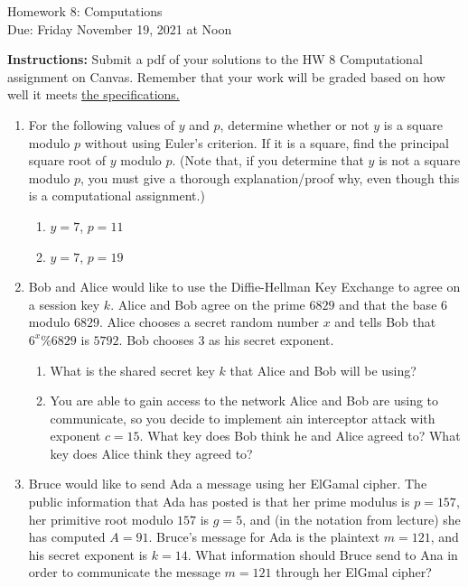 \documentclass[10pt,a4paper]{article}
\begin{document}
\begin{center}
{\Large Homework 8: Computations}\\
Due: Friday November 19, 2021 at Noon\\


\end{center}
{\bf Instructions:} Submit a pdf of your solutions to the HW 8 Computational assignment on Canvas. Remember that your work will be graded based on how well it meets \href{https://docs.google.com/document/d/1emM06_WRh_h941rsjtRE9fRVndJtfRKd9gyS3Fs_rFA/edit?usp=sharing}{the specifications. }


\begin{enumerate}
 \item For the following values of $y$ and $p$, determine whether or not $y$ is a square modulo $p$ without using Euler's criterion.  If it is a square, find the principal square root of $y$ modulo $p$. (Note that, if you determine that $y$ is not a square modulo $p$, you must give a thorough explanation/proof why, even though this is a computational assignment.) \begin{enumerate}
\item $y=7$, $p=11$
\item $y=7$, $p=19$
 \end{enumerate}


\item  Bob and Alice would like to use the Diffie-Hellman Key Exchange to agree on a session key $k$. Alice and Bob agree on the prime $6829$ and that the base $6$ modulo $6829$. Alice chooses a secret random number $x$ and tells Bob that $6^x\%6829$ is $5792$. Bob chooses $3$ as his secret exponent. 
\begin{enumerate}
\item What is the shared secret key $k$ that Alice and Bob will be using?
\item You are able to gain access to the network Alice and Bob are using to communicate, so you decide to implement ain interceptor attack with exponent $c=15$. What key does Bob think he and Alice agreed to? What key does Alice think they agreed to?
\end{enumerate}	
\item Bruce would like to send Ada a message using her ElGamal cipher.  The public information that Ada has posted is that her prime modulus is $p = 157$, her primitive root modulo $157$ is $g = 5$, and (in the notation from lecture) she has computed $A = 91$.  Bruce's message for Ada is the plaintext $m = 121$, and his secret exponent is $k = 14$.  What information should Bruce send to Ana in order to communicate the message $m = 121$ through her ElGmal cipher?  
\end{enumerate}
\end{document}
